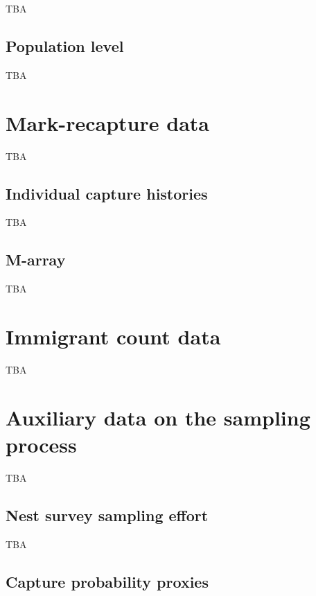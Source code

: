 \documentclass[
]{book}
\begin{document}
TBA

\hypertarget{population-level-1}{%
\subsection{Population level}\label{population-level-1}}

TBA

\hypertarget{mark-recapture-data}{%
\section{Mark-recapture data}\label{mark-recapture-data}}

TBA

\hypertarget{individual-capture-histories}{%
\subsection{Individual capture histories}\label{individual-capture-histories}}

TBA

\hypertarget{m-array}{%
\subsection{M-array}\label{m-array}}

TBA

\hypertarget{immigrant-count-data}{%
\section{Immigrant count data}\label{immigrant-count-data}}

TBA

\hypertarget{auxiliary-data-on-the-sampling-process}{%
\section{Auxiliary data on the sampling process}\label{auxiliary-data-on-the-sampling-process}}

TBA

\hypertarget{nest-survey-sampling-effort}{%
\subsection{Nest survey sampling effort}\label{nest-survey-sampling-effort}}

TBA

\hypertarget{capture-probability-proxies}{%
\subsection{Capture probability proxies}\label{capture-probability-proxies}}
\end{document}
